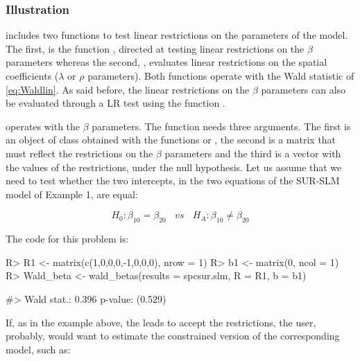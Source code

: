 \documentclass[article]{jss}
\begin{document}
\hypertarget{illustration}{%
\subsubsection{Illustration}\label{illustration}}

 includes two functions to test linear restrictions on the parameters of the model. The first, is the function , directed at testing linear restrictions on the \(\beta\) parameters whereas the second, , evaluates linear restrictions on the spatial coefficients (\(\lambda\) or \(\rho\) parameters). Both functions operate with the Wald statistic of \eqref{eq:Waldlin}. As said before, the linear restrictions on the \(\beta\) parameters can also be evaluated through a LR test using the function .

 operates with the \(\beta\) parameters. The function needs three arguments. The first is an object of  class obtained with the functions  or , the second is a matrix that must reflect the restrictions on the \(\beta\) parameters and the third is a vector with the values of the restrictions, under the null hypothesis. Let us assume that we need to test whether the two intercepts, in the two equations of the SUR-SLM model of Example 1, are equal:

\begin{equation}
H_0: \beta_{10}=\beta_{20} \ \ \ \ vs \ \ \ \ H_A: \beta_{10} \neq \beta_{20}
\label{eq:examlinbeta}
\end{equation}

The code for this problem is:

\begin{CodeChunk}

\begin{CodeInput}
R> R1 <- matrix(c(1,0,0,0,-1,0,0,0), nrow = 1)
R> b1 <- matrix(0, ncol = 1)
R> Wald_beta <- wald_betas(results = spcsur.slm, R = R1, b = b1)
\end{CodeInput}

\begin{CodeOutput}
#> Wald stat.: 0.396 p-value: (0.529)
\end{CodeOutput}
\end{CodeChunk}

If, as in the example above, the  leads to accept the restrictions, the user, probably, would want to estimate the constrained version of the corresponding model, such as:
\end{document}

